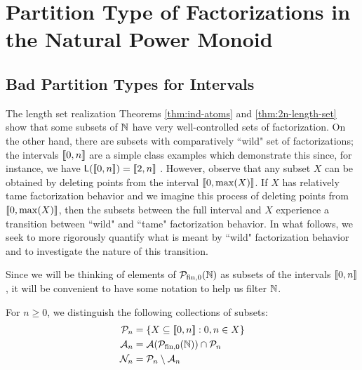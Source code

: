 \chapter{Partition Type of Factorizations in the Natural Power Monoid} \label{ch:partitions}
\section{Bad Partition Types for Intervals} \label{sec:partitions}



The length set realization Theorems \ref{thm:ind-atoms} and \ref{thm:2n-length-set} show that some subsets of $\mathbb{N}$ have very well-controlled sets of factorization.
On the other hand, there are subsets with comparatively ``wild" set of factorizations; the intervals $\llbracket 0,n \rrbracket$ are a simple class examples which demonstrate this since, for instance, we have $\mathsf{L}(\llbracket0,n\rrbracket) = \llbracket 2,n \rrbracket$ \cite[Proposition 4.8]{fan-tringali18}.
However, observe that any subset $X$ can be obtained by deleting points from the interval $\llbracket 0,\max(X) \rrbracket$.
If $X$ has relatively tame factorization behavior and we imagine this process of deleting points from $\llbracket 0,\max(X)\rrbracket$, then the subsets between the full interval and $X$ experience a transition between ``wild" and ``tame" factorization behavior.
In what follows, we seek to more rigorously quantify what is meant by ``wild" factorization behavior and to investigate the nature of this transition.

Since we will be thinking of elements of ${\mathcal{P}_{\textrm{fin},0}(\mathbb{N})}$ as subsets of the intervals $\llbracket 0,n \rrbracket$, it will be convenient to have some notation to help us filter $\mathbb{N}$.


\begin{defn} \label{def:filtration}
	For $n\ge 0$, we distinguish the following collections of subsets:
	\begin{align*}
	\mathcal{P}_n &= \{ X \subseteq \llbracket 0,n \rrbracket : 0,n\in X \} \\
	\mathcal{A}_n &= \mathcal{A}({\mathcal{P}_{\textrm{fin},0}(\mathbb{N})}) \cap \mathcal{P}_n  \\
	\mathcal{N}_n &= \mathcal{P}_n \setminus \mathcal{A}_n 
	\end{align*}
\end{defn}


